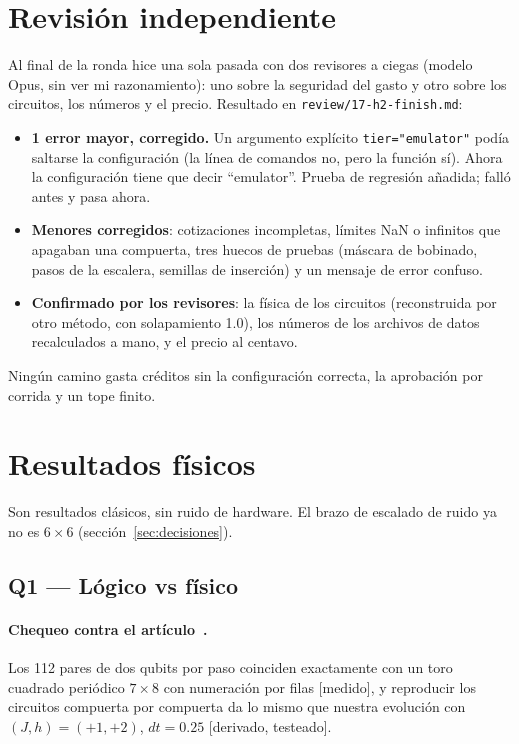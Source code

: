 \documentclass[11pt,a4paper]{article}
\newcommand{\code}[1]{\nolinkurl{#1}}
\begin{document}
\section{Revisi\'on independiente}\label{sec:revision}
Al final de la ronda hice una sola pasada con dos revisores a ciegas (modelo Opus, sin ver mi razonamiento):
uno sobre la seguridad del gasto y otro sobre los circuitos, los n\'umeros y el precio. Resultado en
\code{review/17-h2-finish.md}:
\begin{itemize}[leftmargin=1.4em]
  \item \textbf{1 error mayor, corregido.} Un argumento expl\'icito \texttt{tier="emulator"} pod\'ia saltarse la
    configuraci\'on (la l\'inea de comandos no, pero la funci\'on s\'i). Ahora la configuraci\'on tiene que decir
    ``emulator''. Prueba de regresi\'on a\~nadida; fall\'o antes y pasa ahora.
  \item \textbf{Menores corregidos}: cotizaciones incompletas, l\'imites NaN o infinitos que apagaban una
    compuerta, tres huecos de pruebas (m\'ascara de bobinado, pasos de la escalera, semillas de inserci\'on) y un
    mensaje de error confuso.
  \item \textbf{Confirmado por los revisores}: la f\'isica de los circuitos (reconstruida por otro m\'etodo, con
    solapamiento 1.0), los n\'umeros de los archivos de datos recalculados a mano, y el precio al centavo.
\end{itemize}
Ning\'un camino gasta cr\'editos sin la configuraci\'on correcta, la aprobaci\'on por corrida y un tope finito.

\appendix

\section{Resultados f\'isicos}\label{ap:resultados}

Son resultados cl\'asicos, sin ruido de hardware. El brazo de escalado de ruido ya no es $6{\times}6$ (secci\'on~\ref{sec:decisiones}).

\subsection{Q1 --- L\'ogico vs f\'isico}

\paragraph{Chequeo contra el art\'iculo~\cite{haghshenas2026}.} Los 112 pares de dos qubits por paso coinciden exactamente con un toro
cuadrado peri\'odico $7\times8$ con numeraci\'on por filas [medido], y reproducir los circuitos compuerta por
compuerta da lo mismo que nuestra evoluci\'on con $(J,h)=(+1,+2)$, $dt=0.25$ [derivado, testeado].
\end{document}
